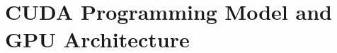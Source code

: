 \documentclass[letterpaper, 10pt, conference]{ieeeconf}
\begin{document}
%
%


%

\section{CUDA Programming Model and GPU Architecture} \label{programming model} 
\end{document}
